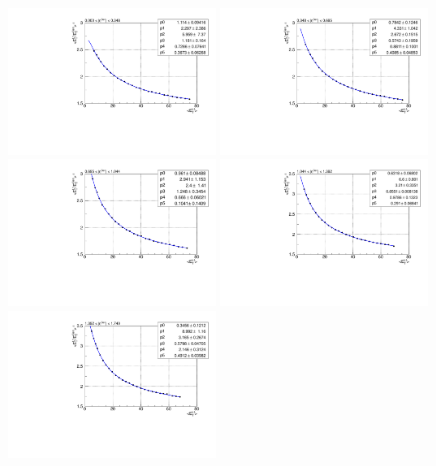 \begin{figure}
\begin{center}
\includegraphics[width=0.49\textwidth]{detector/l1jet/egcor0.pdf}
\includegraphics[width=0.49\textwidth]{detector/l1jet/egcor1.pdf}\\
\includegraphics[width=0.49\textwidth]{detector/l1jet/egcor2.pdf}
\includegraphics[width=0.49\textwidth]{detector/l1jet/egcor3.pdf}\\
\includegraphics[width=0.49\textwidth]{detector/l1jet/egcor4.pdf}

\end{center}
\end{figure}
